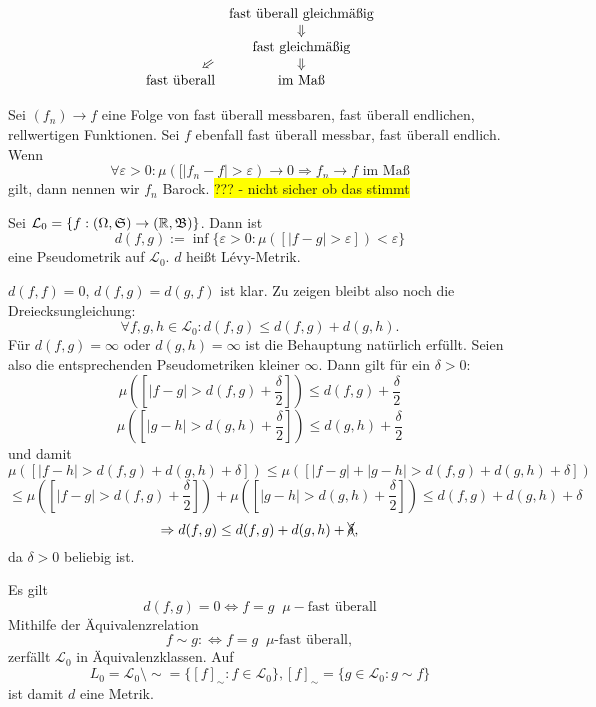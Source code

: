 			\begin{bem}
				\[
				\begin{array}{c c}
					&\text{fast überall gleichmäßig}\\
					&\Downarrow\\
					&\text{fast gleichmäßig}\\
					\hfill\schircherarrow&\Downarrow\\
					\text{fast überall}&\text{im Maß}
				\end{array}\]
			\end{bem}
			
			\begin{defi}
				Sei $(f_n)\to f$ eine Folge von fast überall messbaren, fast überall endlichen, rellwertigen Funktionen. Sei $f$ ebenfall fast überall messbar, fast überall endlich. Wenn 
				\[ \forall\varepsilon>0: \mu([|f_n-f|>\varepsilon)\to 0\Rightarrow f_n\to f\text{ im Maß} \]
				gilt, dann nennen wir $f_n$ Barock. \colorbox{yellow}{??? - nicht sicher ob das stimmt}
			\end{defi}
			
			\begin{lemma}
				Sei $\mathcal{L}_0=\{f:(\Omega,\mathfrak{S})\to(\mathbb{R},\mathfrak{B})\}$. Dann ist
				\[ d(f,g):=\inf\{\varepsilon>0: \mu([|f-g|>\varepsilon])<\varepsilon\} \]
				eine Pseudometrik auf $\mathcal{L}_0$. $d$ heißt Lévy-Metrik. 
			\end{lemma}
			
			\begin{bew}
				$d(f,f)=0$, $d(f,g)=d(g,f)$ ist klar. Zu zeigen bleibt also noch die Dreiecksungleichung:
				\[ \forall f,g,h\in\mathcal{L}_0: d(f,g)\le d(f,g)+d(g,h). \]
				Für $d(f,g)=\infty$ oder $d(g,h)=\infty$ ist die Behauptung natürlich erfüllt. Seien also die entsprechenden Pseudometriken kleiner $\infty$. Dann gilt für ein $\delta >0$:
				\[ \mu([|f-g|>d(f,g)+\frac{\delta}{2}])\le d(f,g)+\frac{\delta}{2} \]
				\[ \mu([|g-h|>d(g,h)+\frac{\delta}{2}])\le d(g,h)+\frac{\delta}{2} \]
				und damit
				\[ \mu([|f-h|>d(f,g)+d(g,h)+\delta])
				\le\mu([|f-g|+|g-h|>d(f,g)+d(g,h)+\delta]) \]
				\[ \le\mu([|f-g|>d(f,g)+\frac{\delta}{2}])+\mu([|g-h|>d(g,h)+\frac{\delta}{2}])\le d(f,g)+d(g,h)+\delta \]
				\[ \Rightarrow d(f,g)\le d(f,g)+d(g,h)+\xcancel{{\delta}}, \]
				da $\delta>0$ beliebig ist.
			\end{bew}
			\begin{bem}
				Es gilt
				\[ d(f,g)=0\Leftrightarrow f=g \;\;\mu-\text{fast überall} \]
				Mithilfe der Äquivalenzrelation
				\[ f\sim g:\Leftrightarrow f=g\;\;\mu\text{-fast überall}, \]
				zerfällt $\mathcal{L}_0$ in Äquivalenzklassen. Auf \[L_0=\mathcal{L}_0\setminus\sim=\{[f]_\sim: f\in\mathcal{L}_0\}, [f]_\sim=\{g\in\mathcal{L}_0: g\sim f\}\]
				ist damit $d$ eine Metrik.
			\end{bem}
			
